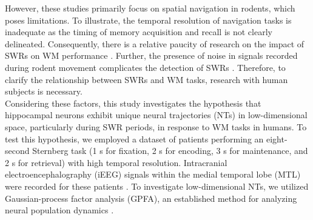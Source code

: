 \indent
However, these studies primarily focus on spatial navigation in rodents, which poses limitations. To illustrate, the temporal resolution of navigation tasks is inadequate as the timing of memory acquisition and recall is not clearly delineated. Consequently, there is a relative paucity of research on the impact of SWRs on WM performance \cite{jadhav_awake_2012}. Further, the presence of noise in signals recorded during rodent movement complicates the detection of SWRs \cite{Watanabe_2021}. Therefore, to clarify the relationship between SWRs and WM tasks, research with human subjects is necessary.
\\
\indent
Considering these factors, this study investigates the hypothesis that hippocampal neurons exhibit unique neural trajectories (NTs) in low-dimensional space, particularly during SWR periods, in response to WM tasks in humans. To test this hypothesis, we employed a dataset of patients performing an eight-second Sternberg task (1 s for fixation, 2 s for encoding, 3 s for maintenance, and 2 s for retrieval) with high temporal resolution. Intracranial electroencephalography (iEEG) signals within the medial temporal lobe (MTL) were recorded for these patients \cite{boran_dataset_2020}. To investigate low-dimensional NTs, we utilized Gaussian-process factor analysis (GPFA), an established method for analyzing neural population dynamics \cite{yu_gaussian-process_2009}.
\label{sec:introduction}